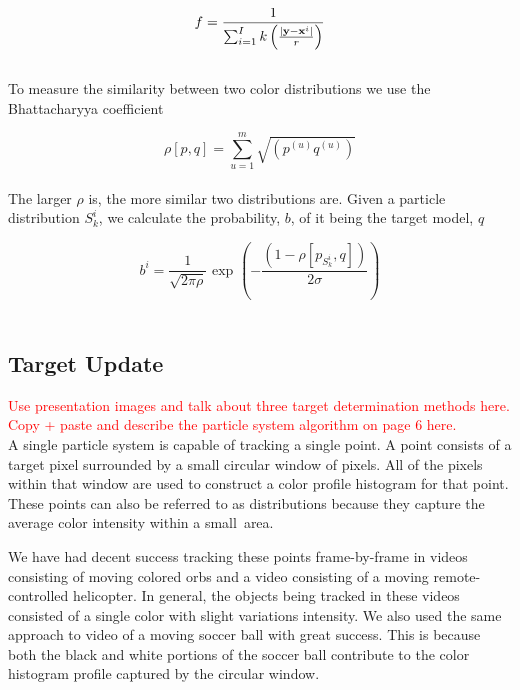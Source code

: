 \documentclass[12pt]{article}
\begin{document}
\begin{equation}
f = \frac{1}{\sum^I_{i=1} k \left ( \frac{| {\bf y} - {\bf x}^i|}{r} \right )}
\label{eq:normfact}
\end{equation} \\

To measure the similarity between two color distributions we use the Bhattacharyya coefficient

\begin{equation}
\rho[p,q] = \sum^m_{u=1} \sqrt{ (p^{(u)} q^{(u)}) } 
\label{eq:bcoeff}
\end{equation} \\

The larger $\rho$ is, the more similar two distributions are. Given a particle distribution $S_k^i$, we calculate the probability, $b$, of it being the target model, $q$

\begin{equation}
b^i = \frac{1}{\sqrt{2\pi\rho}} \text{ exp } \left ( - \frac{(1-\rho[p_{S_k^i},q])}{2\sigma} \right )
\label{eq:bprob}
\end{equation} \\


\subsection{Target Update}

\textcolor{red}{Use presentation images and talk about three target determination methods here.} \\



\textcolor{red}{Copy + paste and describe the particle system algorithm on page 6 here.} \\


A single particle system is capable of tracking a single point. A point consists of a target pixel surrounded by a small circular window of pixels. All of the pixels within that window are used to construct a color profile histogram for that point. These points can also be referred to as distributions because they capture the average color intensity within a small~area.

We have had decent success tracking these points frame-by-frame in videos consisting of moving colored orbs and a video consisting of a moving remote-controlled helicopter. In general, the objects being tracked in these videos consisted of a single color with slight variations intensity. We also used the same approach to video of a moving soccer ball with great success. This is because both the black and white portions of the soccer ball contribute to the color histogram profile captured by the circular window.
\end{document}
